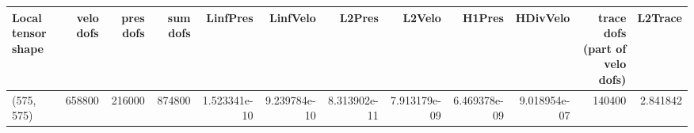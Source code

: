 \begin{tabular}{lrrrrrrrrrrr}
\toprule
Local tensor shape &  velo dofs &  pres dofs &  sum dofs &     LinfPres &     LinfVelo &       L2Pres &       L2Velo &       H1Pres &     HDivVelo &  trace dofs (part of velo dofs) &  L2Trace \\
\midrule
        (575, 575) &     658800 &     216000 &    874800 & 1.523341e-10 & 9.239784e-10 & 8.313902e-11 & 7.913179e-09 & 6.469378e-09 & 9.018954e-07 &                          140400 & 2.841842 \\
\bottomrule
\end{tabular}
